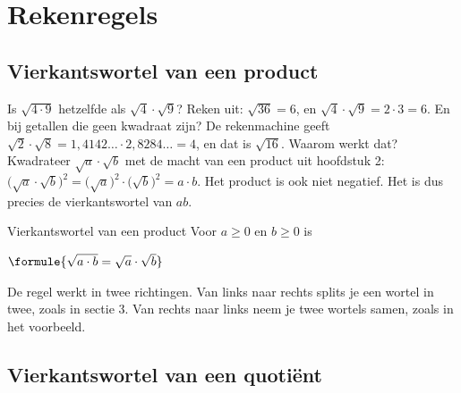 \section{Rekenregels}

\subsection{Vierkantswortel van een product}

Is $\sqrt{4 \cdot 9}$ hetzelfde als $\sqrt4 \cdot \sqrt9$? Reken uit: $\sqrt{36} = 6$, en $\sqrt4 \cdot \sqrt9 = 2 \cdot 3 = 6$. En bij getallen die geen kwadraat zijn? De rekenmachine geeft $\sqrt2 \cdot \sqrt8 = 1,4142\ldots \cdot 2,8284\ldots = 4$, en dat is $\sqrt{16}$. Waarom werkt dat? Kwadrateer $\sqrt a \cdot \sqrt b$ met de macht van een product uit hoofdstuk 2: $\bigl(\sqrt a \cdot \sqrt b\bigr)^2 = \bigl(\sqrt a\bigr)^2 \cdot \bigl(\sqrt b\bigr)^2 = a \cdot b$. Het product is ook niet negatief. Het is dus precies de vierkantswortel van $ab$.

\begin{theorie}
\begin{stelling}{Vierkantswortel van een product}
Voor $a \geqslant 0$ en $b \geqslant 0$ is

\vspace{1mm}
\qquad $\formule{\sqrt{a \cdot b} = \sqrt a \cdot \sqrt b}$
\end{stelling}
\end{theorie}

De regel werkt in twee richtingen. Van links naar rechts splits je een wortel in twee, zoals in sectie 3. Van rechts naar links neem je twee wortels samen, zoals in het voorbeeld.


\begin{oefeningen}
\end{oefeningen}

\subsection{Vierkantswortel van een quotiënt}

